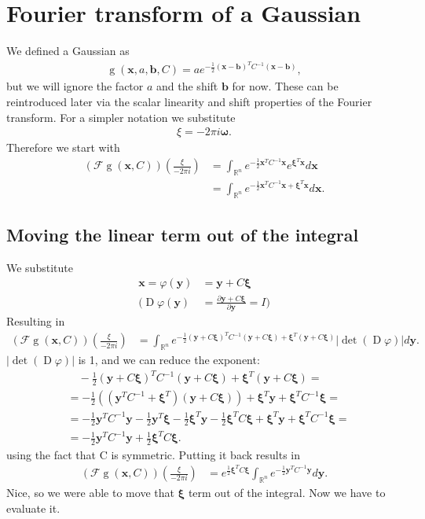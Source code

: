 \documentclass{paper}
\newcommand{\abs}[1]{\left| #1 \right|}
\newcommand{\F}{\ensuremath{\mathcal{F}}}
\newcommand{\vr}[1]{\ensuremath{\boldsymbol{#1}}}
\newcommand{\f}[1]{\operatorname{#1}}
\newcommand{\omegavec}[0]{\ensuremath{\vr{\omega{}}}}
\newcommand{\xivec}[0]{\ensuremath{\vr{\xi{}}}}
\newcommand{\yvec}[0]{\ensuremath{\vr{y}}}
\begin{document}
\section{Fourier transform of a Gaussian}
We defined a Gaussian as 
\begin{align*}
	\f{g}(\vr{x}, a, \vr{b}, C) = a e^{-\frac{1}{2}(\vr{x}-\vr{b})^T C^{-1}(\vr{x}-\vr{b})},
\end{align*}
but we will ignore the factor $a$ and the shift $\vr{b}$ for now.
These can be reintroduced later via the scalar linearity and shift properties of the Fourier transform.
For a simpler notation we substitute
\begin{align*}
	\xi = -2 \pi i \omegavec.
\end{align*}
Therefore we start with
\begin{align*}
	(\F\f{g}(\vr{x}, C))(\frac{\xi}{-2 \pi i}) &= \int_{\mathbb{R}^n} e^{-\frac{1}{2} \vr{x}^T C^{-1} \vr{x}} e^{\vr{\xi}^T \vr{x}} d\vr{x} \\
	&= \int_{\mathbb{R}^n} e^{-\frac{1}{2} \vr{x}^T C^{-1} \vr{x} + \vr{\xi}^T \vr{x}} d\vr{x}.
\end{align*}

\subsection*{Moving the linear term out of the integral}
We substitute
\begin{align*}
	\vr{x} = \varphi(\vr{y}) &= \vr{y} + C\vr{\xi} \\
	\Bigg( \f{D}\varphi(\yvec) &= \frac{\partial \vr{y} + C\vr{\xi}}{\partial \vr{y}} = I \Bigg)
\end{align*}
Resulting in
\begin{align*}
	(\F\f{g}(\vr{x}, C))(\frac{\xi}{-2 \pi i})
	&= \int_{\mathbb{R}^n} e^{-\frac{1}{2} (\yvec + C\xivec)^T C^{-1} (\yvec + C\xivec) + \xivec^T (\yvec + C\xivec)} \abs{\f{det}(\f{D}\varphi)} d\yvec.
\end{align*}
$\abs{\f{det}(\f{D}\varphi)}$ is 1, and we can reduce the exponent:
\begin{align*}
	&\quad -\frac{1}{2} (\yvec + C\xivec)^T C^{-1} (\yvec + C\xivec) + \xivec^T (\yvec + C\xivec) = \\
	&= -\frac{1}{2} \left( (\yvec^T C^{-1} + \xivec^T)(\yvec + C \xivec) \right) + \xivec^T \yvec + \xivec^T C^{-1} \xivec = \\
	&= -\frac{1}{2} \yvec^T C^{-1} \yvec - \frac{1}{2} \yvec^T \xivec -\frac{1}{2} \xivec^T \yvec -\frac{1}{2} \xivec^T C \xivec + \xivec^T \yvec + \xivec^T C^{-1} \xivec = \\
	&= -\frac{1}{2} \yvec^T C^{-1} \yvec + \frac{1}{2} \xivec^T C \xivec.
\end{align*}
using the fact that C is symmetric.
Putting it back results in
\begin{align}
	\label{eq:fourier_only_gauss_int_left}
	(\F\f{g}(\vr{x}, C))(\frac{\xi}{-2 \pi i})
	&= e^{\frac{1}{2} \xivec^T C \xivec} \int_{\mathbb{R}^n} e^{-\frac{1}{2} \yvec^T C^{-1} \yvec}  d\yvec.
\end{align}
Nice, so we were able to move that $\xivec$ term out of the integral.
Now we have to evaluate it.
\end{document}
